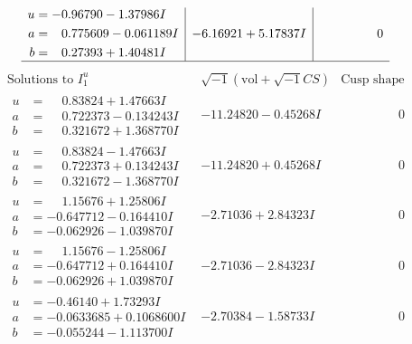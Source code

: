 \documentclass[1p]{elsarticle_modified}
\theoremstyle{definition}
\newcommand{\I}{\sqrt{-1}}
\begin{document}
$$\begin{array}{c|c|c}
\begin{aligned}
u &= -0.96790 - 1.37986 I \\
a &= \phantom{-}0.775609 - 0.061189 I \\
b &= \phantom{-}0.27393 + 1.40481 I\end{aligned}
 & -6.16921 + 5.17837 I & \phantom{-0.000000 } 0\\
 \hline 
 \end{array}$$\newpage$$\begin{array}{c|c|c}  
\text{Solutions to }I^u_{1}& \I (\text{vol} + \sqrt{-1}CS) & \text{Cusp shape}\\
 \hline 
\begin{aligned}
u &= \phantom{-}0.83824 + 1.47663 I \\
a &= \phantom{-}0.722373 - 0.134243 I \\
b &= \phantom{-}0.321672 + 1.368770 I\end{aligned}
 & -11.24820 - 0.45268 I & \phantom{-0.000000 } 0 \\ \hline\begin{aligned}
u &= \phantom{-}0.83824 - 1.47663 I \\
a &= \phantom{-}0.722373 + 0.134243 I \\
b &= \phantom{-}0.321672 - 1.368770 I\end{aligned}
 & -11.24820 + 0.45268 I & \phantom{-0.000000 } 0 \\ \hline\begin{aligned}
u &= \phantom{-}1.15676 + 1.25806 I \\
a &= -0.647712 - 0.164410 I \\
b &= -0.062926 - 1.039870 I\end{aligned}
 & -2.71036 + 2.84323 I & \phantom{-0.000000 } 0 \\ \hline\begin{aligned}
u &= \phantom{-}1.15676 - 1.25806 I \\
a &= -0.647712 + 0.164410 I \\
b &= -0.062926 + 1.039870 I\end{aligned}
 & -2.71036 - 2.84323 I & \phantom{-0.000000 } 0 \\ \hline\begin{aligned}
u &= -0.46140 + 1.73293 I \\
a &= -0.0633685 + 0.1068600 I \\
b &= -0.055244 - 1.113700 I\end{aligned}
 & -2.70384 - 1.58733 I & \phantom{-0.000000 } 0 \\ \hline\begin{aligned}

\end{aligned}
\end{array}$$
\end{document}
